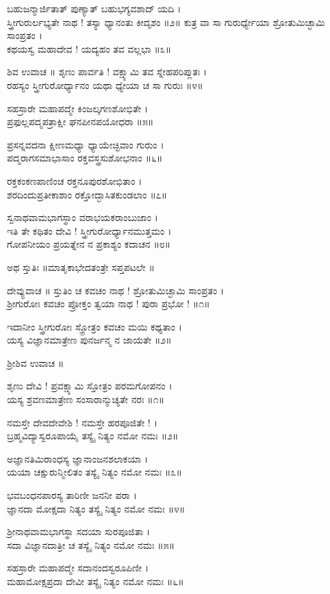 ಬಹುಜನ್ಮಾರ್ಜಿತಾತ್ ಪುಣ್ಯಾತ್ ಬಹುಭಗ್ಯವಶಾದ್ ಯದಿ ।\\
ಸ್ತ್ರೀಗುರುರ್ಲಭ್ಯತೇ ನಾಥ ! ತಸ್ಯಾ ಧ್ಯಾನಂತು ಕೀದೃಶಂ ॥೨॥
ಕುತ್ರ ವಾ ಸಾ ಗುರುರ್ಧ್ಯೇಯಾ ಶ್ರೋತುಮಿಚ್ಛಾಮಿ ಸಾಂಪ್ರತಂ ।\\
ಕಥಯಸ್ವ ಮಹಾದೇವ ! ಯದ್ಯಹಂ ತವ ವಲ್ಲಭಾ ॥೩॥

ಶಿವ ಉವಾಚ ॥
ಶೃಣು ಪಾರ್ವತಿ ! ವಕ್ಷ್ಯಾಮಿ ತವ ಸ್ನೇಹಪರಿಪ್ಲುತಃ ।\\
ರಹಸ್ಯಂ ಸ್ತ್ರೀಗುರೋರ್ಧ್ಯಾನಂ ಯಥಾ ಧ್ಯೇಯಾ ಚ ಸಾ ಗುರುಃ ॥೪॥

ಸಹಸ್ರಾರೇ ಮಹಾಪದ್ಮೇ ಕಿಂಜಲ್ಕಗಣಶೋಭಿತೇ ।\\
ಪ್ರಫುಲ್ಲಪದ್ಮಪತ್ರಾಕ್ಷೀ ಘನಪೀನಪಯೋಧರಾ ॥೫॥

ಪ್ರಸನ್ನವದನಾ ಕ್ಷೀಣಮಧ್ಯಾ ಧ್ಯಾಯೇಚ್ಛಿವಾಂ ಗುರುಂ ।\\
ಪದ್ಮರಾಗಸಮಾಭಾಸಾಂ ರಕ್ತವಸ್ತ್ರಸುಶೋಭನಾಂ ॥೬॥

ರಕ್ತಕಂಕಣಪಾಣಿಂಚ ರಕ್ತನೂಪುರಶೋಭಿತಾಂ ।\\
ಶರದಿಂದುಪ್ರತೀಕಾಶಾಂ ರಕ್ತೋದ್ಭಾಸಿತಕುಂಡಲಾಂ ॥೭॥

ಸ್ವನಾಥವಾಮಭಾಗಸ್ಥಾಂ ವರಾಭಯಕರಾಂಬುಜಾಂ ।\\
ಇತಿ ತೇ ಕಥಿತಂ ದೇವಿ ! ಸ್ತ್ರೀಗುರೋರ್ಧ್ಯಾನಮುತ್ತಮಂ ।\\
ಗೋಪನೀಯಂ ಪ್ರಯತ್ನೇನ ನ ಪ್ರಕಾಶ್ಯಂ ಕದಾಚನ ॥೮॥

ಅಥ ಸ್ತುತಿಃ ॥ಮಾತೃಕಾಭೇದತಂತ್ರೇ ಸಪ್ತಪಟಲೇ ॥

ದೇವ್ಯುವಾಚ ॥
ಸ್ತುತಿಂ ಚ ಕವಚಂ ನಾಥ ! ಶ್ರೋತುಮಿಚ್ಛಾಮಿ ಸಾಂಪ್ರತಂ ।\\
ಶ್ರೀಗುರೋಃ ಕವಚಂ ಪ್ರೋಕ್ತಂ ತ್ವಯಾ ನಾಥ ! ಪುರಾ ಪ್ರಭೋ ! ॥೧॥

ಇದಾನೀಂ ಸ್ತ್ರೀಗುರೋಃ ಸ್ತ್ರೋತ್ರಂ ಕವಚಂ ಮಯಿ ಕಥ್ಯತಾಂ ।\\
ಯಸ್ಯ ವಿಜ್ಞಾನಮಾತ್ರೇಣ ಪುನರ್ಜನ್ಮ ನ ಜಾಯತೇ ॥೨॥

ಶ್ರೀಶಿವ ಉವಾಚ ॥

ಶೃಣು ದೇವಿ ! ಪ್ರವಕ್ಷ್ಯಾಮಿ ಸ್ತೋತ್ರಂ ಪರಮಗೋಪನಂ ।\\
ಯಸ್ಯ ಶ್ರವಣಮಾತ್ರೇಣ ಸಂಸಾರಾನ್ಮುಚ್ಯತೇ ನರಃ ॥೧॥

ನಮಸ್ತೇ ದೇವದೇವೇಶಿ ! ನಮಸ್ತೇ ಹರಪೂಜಿತೇ ! ।\\
ಬ್ರಹ್ಮವಿದ್ಯಾಸ್ವರೂಪಾಯೈ ತಸ್ಯೈ ನಿತ್ಯಂ ನಮೋ ನಮಃ ॥೨॥

ಅಜ್ಞಾನತಿಮಿರಾಂಧಸ್ಯ ಜ್ಞಾನಾಂಜನಶಲಾಕಯಾ ।\\
ಯಯಾ ಚಕ್ಷುರುನ್ಮೀಲಿತಂ ತಸ್ಯೈ ನಿತ್ಯಂ ನಮೋ ನಮಃ ॥೩॥

ಭವಬಂಧನಪಾರಸ್ಯ ತಾರಿಣೀ ಜನನೀ ಪರಾ ।\\
ಜ್ಞಾನದಾ ಮೋಕ್ಷದಾ ನಿತ್ಯಂ ತಸ್ಯೈ ನಿತ್ಯಂ ನಮೋ ನಮಃ ॥೪॥

ಶ್ರೀನಾಥವಾಮಭಾಗಸ್ಥಾ ಸದಯಾ ಸುರಪೂಜಿತಾ ।\\
ಸದಾ ವಿಜ್ಞಾನದಾತ್ರೀ ಚ ತಸ್ಯೈ ನಿತ್ಯಂ ನಮೋ ನಮಃ ॥೫॥

ಸಹಸ್ರಾರೇ ಮಹಾಪದ್ಮೇ ಸದಾನಂದಸ್ವರೂಪಿಣೀ ।\\
ಮಹಾಮೋಕ್ಷಪ್ರದಾ ದೇವೀ ತಸ್ಯೈ ನಿತ್ಯಂ ನಮೋ ನಮಃ ॥೬॥


